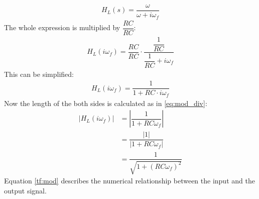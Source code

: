 \begin{align} \label{eq:trans_low}
H_{L}(s) = \dfrac{\omega}{\omega+i \omega_f} 
\end{align}
The whole expression is multiplied by $\dfrac{RC}{RC}$:
\begin{align}
H_{L}(i \omega_f) = \dfrac{RC}{RC} \cdot \dfrac{\dfrac{1}{RC}}{\dfrac{1}{RC}+i \omega_f} 
\end{align}
This can be simplified:
\begin{align}
H_{L}(i \omega_f) =  \dfrac{1}{1+RC \cdot i \omega_f} 
\end{align}
Now the length of the both sides is calculated as in \eqref{eq:mod_div}:
\begin{align}
\left|H_{L}(i \omega_f) \right| &=  \left|\dfrac{1}{1+RC \omega_f} \right| 
\\
&=\dfrac{|1|}{|1+RC\omega_f |}
\\
&=  \dfrac{1}{\sqrt{1+(RC \omega_f)^2}} \label{tf:mod}
\end{align}
Equation \eqref{tf:mod} describes the numerical relationship between the input and the output signal.
